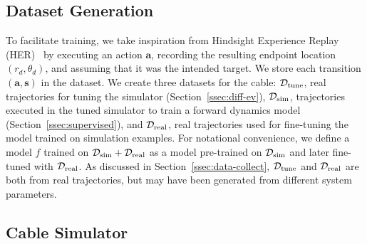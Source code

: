 \documentclass[letterpaper, 10 pt, conference]{ieeeconf}  %
\newcommand{\ba}{\mathbf{a}}
\newcommand{\bs}{\mathbf{s}}
\newcommand{\remark}[3]{{\color{#2}[#1: #3]}}
\newcommand{\jonathan}[1]{\remark{Jonathan}{cyan}{#1}}
\begin{document}
\subsection{Dataset Generation}\label{ssec:data-gen}

To facilitate training, we take inspiration from Hindsight Experience Replay (HER)~\cite{HER_2017} by executing an action $\ba$, recording the resulting endpoint location $(r_d, \theta_d)$, and assuming that it was the intended target. We store each transition $(\ba, \bs)$ in the dataset. We create three datasets for the cable: $\mathcal{D}_{\rm tune}$, real trajectories for tuning the simulator (Section~\ref{ssec:diff-ev}), $\mathcal{D}_{\rm sim}$, trajectories executed in the tuned simulator to train a forward dynamics model (Section~\ref{ssec:supervised}), and $\mathcal{D}_{\rm real}$, real trajectories used for fine-tuning the model trained on simulation examples. For notational convenience, we define a model $f$ trained on $\mathcal{D}_{\rm sim} + \mathcal{D}_{\rm real}$ as a model pre-trained on $\mathcal{D}_{\rm sim}$ and later fine-tuned with $\mathcal{D}_{\rm real}$. As discussed in Section~\ref{ssec:data-collect}, $\mathcal{D}_{\rm tune}$ and $\mathcal{D}_{\rm real}$ are both from real trajectories, but may have been generated from different system parameters.


\subsection{Cable Simulator}
\label{ssec:simulator}

  
\end{document}
